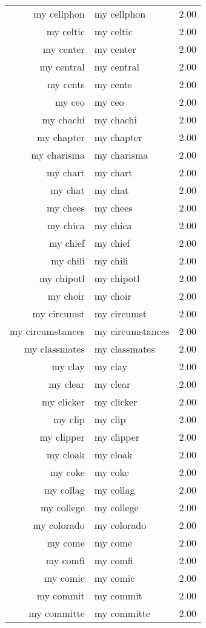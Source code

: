 \begin{table}[ht]
\begin{tabular}{rlr}
  my cellphon & my cellphon & 2.00 \\ 
  my celtic & my celtic & 2.00 \\ 
  my center & my center & 2.00 \\ 
  my central & my central & 2.00 \\ 
  my cents & my cents & 2.00 \\ 
  my ceo & my ceo & 2.00 \\ 
  my chachi & my chachi & 2.00 \\ 
  my chapter & my chapter & 2.00 \\ 
  my charisma & my charisma & 2.00 \\ 
  my chart & my chart & 2.00 \\ 
  my chat & my chat & 2.00 \\ 
  my chees & my chees & 2.00 \\ 
  my chica & my chica & 2.00 \\ 
  my chief & my chief & 2.00 \\ 
  my chili & my chili & 2.00 \\ 
  my chipotl & my chipotl & 2.00 \\ 
  my choir & my choir & 2.00 \\ 
  my circumst & my circumst & 2.00 \\ 
  my circumstances & my circumstances & 2.00 \\ 
  my classmates & my classmates & 2.00 \\ 
  my clay & my clay & 2.00 \\ 
  my clear & my clear & 2.00 \\ 
  my clicker & my clicker & 2.00 \\ 
  my clip & my clip & 2.00 \\ 
  my clipper & my clipper & 2.00 \\ 
  my cloak & my cloak & 2.00 \\ 
  my coke & my coke & 2.00 \\ 
  my collag & my collag & 2.00 \\ 
  my college & my college & 2.00 \\ 
  my colorado & my colorado & 2.00 \\ 
  my come & my come & 2.00 \\ 
  my comfi & my comfi & 2.00 \\ 
  my comic & my comic & 2.00 \\ 
  my commit & my commit & 2.00 \\ 
  my committe & my committe & 2.00 \\ 

\end{tabular}
\end{table}
